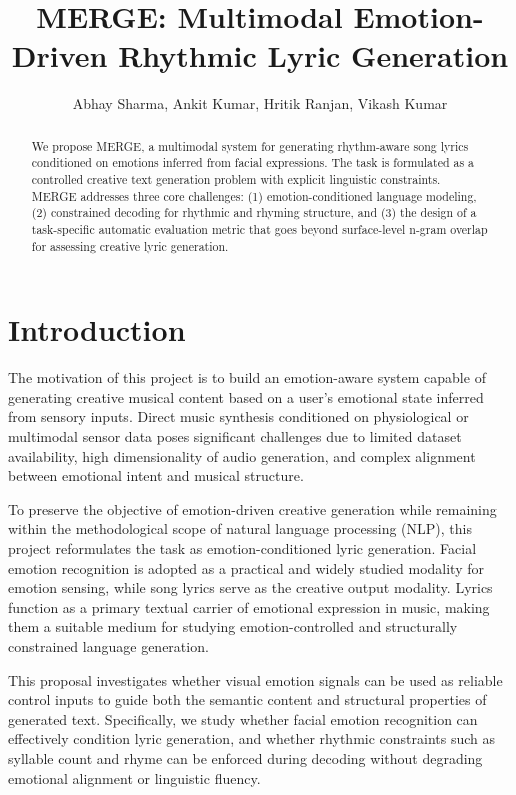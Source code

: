 \documentclass[11pt]{article}
\title{MERGE: Multimodal Emotion-Driven Rhythmic Lyric Generation}
\author{Abhay Sharma, Ankit Kumar, Hritik Ranjan, Vikash Kumar}
\begin{document}
\maketitle

\begin{abstract}
We propose MERGE, a multimodal system for generating rhythm-aware song lyrics conditioned on emotions inferred from facial expressions. The task is formulated as a controlled creative text generation problem with explicit linguistic constraints. MERGE addresses three core challenges: (1) emotion-conditioned language modeling, (2) constrained decoding for rhythmic and rhyming structure, and (3) the design of a task-specific automatic evaluation metric that goes beyond surface-level n-gram overlap for assessing creative lyric generation.
\end{abstract}

\section{Introduction}

The motivation of this project is to build an emotion-aware system capable of generating creative musical content based on a user’s emotional state inferred from sensory inputs. Direct music synthesis conditioned on physiological or multimodal sensor data poses significant challenges due to limited dataset availability, high dimensionality of audio generation, and complex alignment between emotional intent and musical structure.

To preserve the objective of emotion-driven creative generation while remaining within the methodological scope of natural language processing (NLP), this project reformulates the task as emotion-conditioned lyric generation. Facial emotion recognition is adopted as a practical and widely studied modality for emotion sensing, while song lyrics serve as the creative output modality. Lyrics function as a primary textual carrier of emotional expression in music, making them a suitable medium for studying emotion-controlled and structurally constrained language generation.

This proposal investigates whether visual emotion signals can be used as reliable control inputs to guide both the semantic content and structural properties of generated text. Specifically, we study whether facial emotion recognition can effectively condition lyric generation, and whether rhythmic constraints such as syllable count and rhyme can be enforced during decoding without degrading emotional alignment or linguistic fluency.
\end{document}
